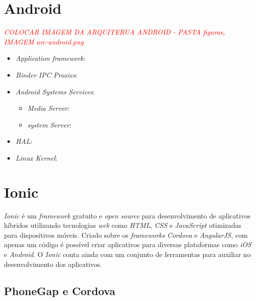 \section{Android} \label{android}




\textit{\textcolor{red}{COLOCAR IMAGEM DA ARQUITERUA ANDROID - PASTA figuras, IMAGEM arc-android.png}}

\begin{itemize}

    \item \textit{Application framework}:
    \item \textit{Binder IPC Proxies}: 
    \item \textit{Android Systems Services}:
    
    \begin{itemize}
    
        \item \textit{Media Server}:
        \item \textit{system Server}:
         
    \end{itemize}
    
    \item \textit{HAL}:
    \item \textit{Linux Kernel}:
    
\end{itemize}

\section{Ionic} \label{ionic}

\textit{Ionic} é um \textit{framework} gratuito e \textit{open source} para desenvolvimento de aplicativos híbridos utilizando tecnologias 
\textit{web} como \textit{HTML}, \textit{CSS} e \textit{JavaScript} otimizadas para dispositivos móveis. Criado sobre os \textit{frameworks} \textit{Cordova} e \textit{AngularJS},
com apenas um código é possível criar aplicativos para diversas plataformas como \textit{iOS} e \textit{Android}. O \textit{Ionic} conta ainda com um conjunto de ferramentas para auxiliar 
no desenvolvimento dos aplicativos.

\subsection{PhoneGap e Cordova} \label{subsec:phonegap}

